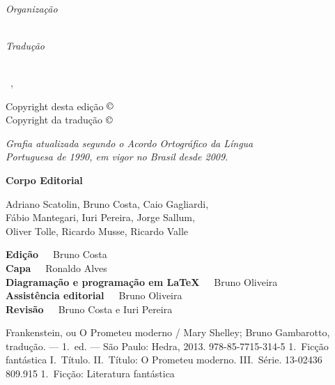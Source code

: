 \documentclass{../../../templates/template_1/livrodaclasse}
\begin{document}
{\centering\vspace*{10em}\thispagestyle{empty}
{\huge\titulo\par}}
\cleardoublepage
{\centering\vspace*{10em}\thispagestyle{empty}
{\huge\titulo\medskip\par}
{\Large\textls{\autor}\par}
\vspace*{8em}
{\textls{\organizador}}\\
{\small\textit{Organização}}\medskip\par
{\textls{\tradutor}}\\
{\small\textit{Tradução}}\par
\vfill\par
\logoum\\
{\normalsize\ \cidade, \ano}\par}
\clearpage

\begingroup
\parindent0mm\parskip0mm
\footnotesize
\thispagestyle{empty}

Copyright desta edição $\copyright$ \direitos\ \ano\\
Copyright da tradução $\copyright$ \tradutor\medskip

{\itshape
Grafia atualizada segundo o Acordo Ortográfico da Língua\\
Portuguesa de 1990, em vigor no Brasil desde 2009.
}\medskip

\textbf{Corpo Editorial}\smallskip

Adriano Scatolin,
Bruno Costa,
Caio Gagliardi,\\
Fábio Mantegari,
Iuri Pereira,
Jorge Sallum,\\
Oliver Tolle,
Ricardo Musse,
Ricardo Valle\medskip

\textbf{Edição}\ \ \  Bruno Costa\\
\textbf{Capa}\ \ \  Ronaldo Alves\\
\textbf{Diagramação e programação em \LaTeX}\ \ \  Bruno Oliveira\\
\textbf{Assistência editorial}\ \ \  Bruno Oliveira\\
\textbf{Revisão}\ \ \ Bruno Costa e Iuri Pereira

%
{Frankenstein, ou O Prometeu moderno / Mary Shelley; Bruno Gambarotto,
tradução. --- 1.~ed. --- São Paulo: Hedra, 2013.}%
{978-85-7715-314-5}%
{1.~Ficção fantástica I.~Título. II.~Título: O Prometeu moderno. III.~Série.}%
{13-02436}%
{809.915}%
{1.~Ficção: Literatura fantástica}
\end{document}
